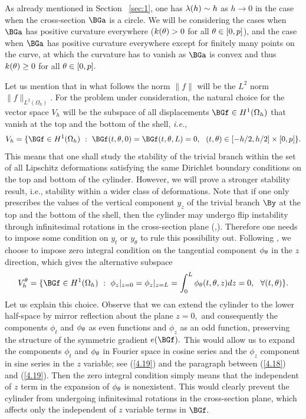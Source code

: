 As already mentioned in Section~ \ref{sec:1}, one has $\lambda(h)\sim h$ as $h\to 0$ in the case when the cross-section $\BGa$ is a circle. We will be considering the cases when $\BGa$ has positive curvature everywhere ($k(\theta)>0$ for all $\theta\in [0,p]$), and the case when $\BGa$ has positive curvature 
everywhere except for finitely many points on the curve, at which the curvature has to vanish as $\BGa$ is convex and thus $k(\theta)\geq 0$ for all $\theta\in [0,p].$ 



Let us mention that in what follows the norm $\|f\|$ will be the $L^2$ norm $\|f\|_{L^2(\Omega_h)}.$ For the problem under consideration, the natural choice for the vector space $V_h$ will be the subspace of all displacements $\BGf\in H^1(\Omega_h)$ that vanish at the top and the bottom of the shell, \textit{i.e.},  
\begin{equation}
\label{3.4}
V_h=\{\BGf\in H^1(\Omega_h) \ : \ \BGf(t,\Gth,0)=\BGf(t,\Gth,L)=0, \ \ (t,\Gth)\in [-h/2,h/2]\times [0,p] \}.
\end{equation}
This means that one shall study the stability of the trivial branch within the set of all Lipschitz deformations satisfying the same Dirichlet boundary conditions on the top and bottom of the cylinder. However, we will prove a stronger stability result, i.e., stability within a wider class of deformations. Note that if one only prescribes the values of the vertical component $y_z$ of the trivial branch $\By$ at the top and the bottom of the shell, then the cylinder may undergo flip instability through infinitesimal rotations in the cross-section plane (\cite{bib:Gra.Har.2},\cite{bib:Gra.Tru.}). Therefore one needs to impose some condition on $y_t$ or $y_\theta$ to rule this possibility out. Following \cite{bib:Gra.Har.3}, we choose to impose zero integral condition on the tangential component $\phi_\theta$ in the $z$ direction, which gives the alternative subspace
\begin{equation}
\label{3.4.1}
V_h^\Gth=\{\BGf\in H^1(\Omega_h) \ : \  \phi_z|_{z=0}=\phi_z|_{z=L}=\int_0^L\phi_\Gth(t,\Gth,z)dz=0, \ \ \forall (t,\Gth)\}.
\end{equation}
Let us explain this choice. Observe that we can extend the cylinder to the lower half-space by mirror reflection about the plane $z=0,$ and consequently the components $\phi_t$ and $\phi_\theta$ as even functions and $\phi_z$ as an odd function, preserving the structure of the symmetric gradient $e(\BGf).$ This would allow us to expand the components $\phi_t$ and $\phi_\theta$ in Fourier space in cosine series and the $\phi_z$ component in sine series in the $z$ variable; see (\ref{4.19}) and the paragraph between (\ref{4.18}) and (\ref{4.19}). Then the zero integral condition simply means that the independent of $z$ term in the expansion of $\phi_\theta$ is nonexistent. This would clearly prevent the cylinder from undergoing infinitesimal rotations in the cross-section plane, which affects only the independent of $z$ variable terms in $\BGf.$

